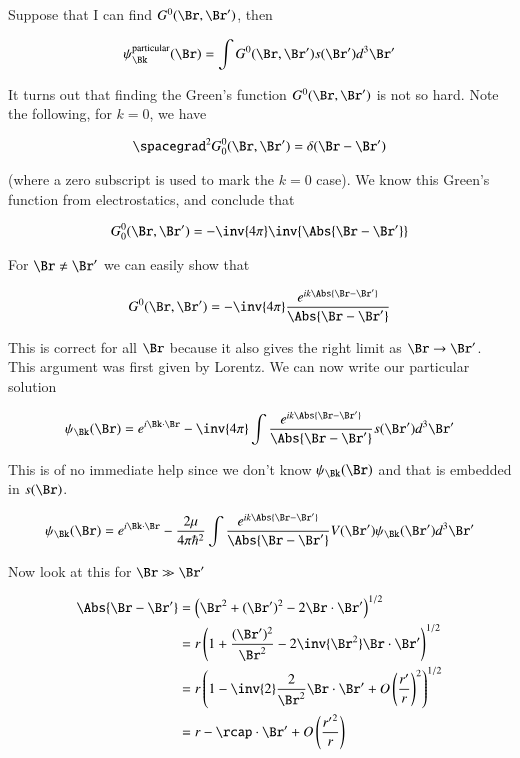 Suppose that I can find $G^0(\Br, \Br')$, then

\begin{equation}\label{eqn:qmTwoL25:90}
\psi_\Bk^{\text{particular}}(\Br) = \int G^0(\Br, \Br') s(\Br') d^3 \Br'
\end{equation}

It turns out that finding the Green's function $G^0(\Br, \Br')$ is not so hard.  Note the following, for $k = 0$, we have

\begin{equation}\label{eqn:qmTwoL25:110}
\spacegrad^2 G^0_0(\Br, \Br') = \delta(\Br - \Br')
\end{equation}

(where a zero subscript is used to mark the $k = 0$ case).  We know this Green's function from electrostatics, and conclude that 

\begin{equation}\label{eqn:qmTwoL25:130}
G^0_0(\Br, \Br') = - \inv{4 \pi} \inv{\Abs{\Br - \Br'}}
\end{equation}

For $\Br \ne \Br'$ we can easily show that

\begin{equation}\label{eqn:qmTwoL25:150}
G^0(\Br, \Br') = - \inv{4 \pi} \frac{e^{i k\Abs{\Br - \Br'}}}{\Abs{\Br - \Br'}}
\end{equation}

This is correct for all $\Br$ because it also gives the right limit as $\Br \rightarrow \Br'$.  This argument was first given by Lorentz.  We can now write our particular solution

\begin{equation}\label{eqn:qmTwoL25:170}
\psi_\Bk(\Br) 
= e^{i \Bk \cdot \Br}
- \inv{4 \pi} \int \frac{e^{i k\Abs{\Br - \Br'}}}{\Abs{\Br - \Br'}} s(\Br') d^3 \Br'
\end{equation}

This is of no immediate help since we don't know $\psi_\Bk(\Br)$ and that is embedded in $s(\Br)$.

\begin{equation}\label{eqn:qmTwoL25:190}
\psi_\Bk(\Br) 
= e^{i \Bk \cdot \Br}
- \frac{2 \mu}{4 \pi \hbar^2} \int \frac{e^{i k\Abs{\Br - \Br'}}}{\Abs{\Br - \Br'}} V(\Br') \psi_\Bk(\Br') d^3 \Br'
\end{equation}

Now look at this for $\Br \gg \Br'$

\begin{align*}
\Abs{\Br - \Br'} 
&= 
\left( 
\Br^2 + (\Br')^2 - 2 \Br \cdot \Br'
\right)^{1/2} \\
&=
r 
\left( 
1 + \frac{(\Br')^2}{\Br^2} - 2 \inv{\Br^2} \Br \cdot \Br'
\right)^{1/2} \\
&=
r 
\left( 
1 - \inv{2} \frac{2}{\Br^2} \Br \cdot \Br'
+ O\left(\frac{r'}{r}\right)^2
\right)^{1/2} \\
&=
r 
- \rcap \cdot \Br'
+ O\left(\frac{{r'}^2}{r}\right)
\end{align*}

